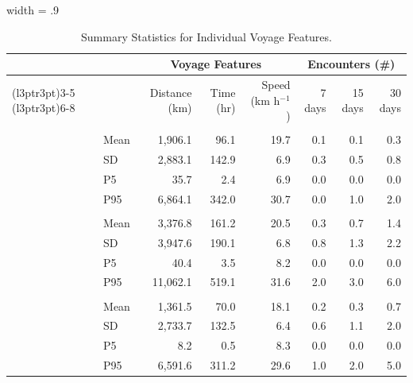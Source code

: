 \begin{table}
\centering
\caption{\label{tab:summary}Summary Statistics for Individual Voyage Features.}
\centering
\begin{adjustbox}{width = .9\textwidth}
\begin{threeparttable}
\begin{tabular}[t]{llrrrrrr}
\toprule
\multicolumn{2}{c}{ } & \multicolumn{3}{c}{Voyage Features} & \multicolumn{3}{c}{Encounters (\#)} \\
\cmidrule(l{3pt}r{3pt}){3-5} \cmidrule(l{3pt}r{3pt}){6-8}
 &  & Distance (km) & Time (hr) & Speed (km h$^{-1}$) & 7 days & 15 days & 30 days\\
\midrule
\addlinespace[0.3em]
\multicolumn{8}{l}{Gulf of Aden}\\
\hspace{1em} & Mean & 1,906.1 & 96.1 & 19.7 & 0.1 & 0.1 & 0.3\\
\hspace{1em} & SD & 2,883.1 & 142.9 & 6.9 & 0.3 & 0.5 & 0.8\\
\hspace{1em} & P5 & 35.7 & 2.4 & 6.9 & 0.0 & 0.0 & 0.0\\
\hspace{1em} & P95 & 6,864.1 & 342.0 & 30.7 & 0.0 & 1.0 & 2.0\\
\addlinespace[0.3em]
\multicolumn{8}{l}{Gulf of Guinea}\\
\hspace{1em} & Mean & 3,376.8 & 161.2 & 20.5 & 0.3 & 0.7 & 1.4\\
\hspace{1em} & SD & 3,947.6 & 190.1 & 6.8 & 0.8 & 1.3 & 2.2\\
\hspace{1em} & P5 & 40.4 & 3.5 & 8.2 & 0.0 & 0.0 & 0.0\\
\hspace{1em} & P95 & 11,062.1 & 519.1 & 31.6 & 2.0 & 3.0 & 6.0\\
\addlinespace[0.3em]
\multicolumn{8}{l}{Southeast Asia}\\
\hspace{1em} & Mean & 1,361.5 & 70.0 & 18.1 & 0.2 & 0.3 & 0.7\\
\hspace{1em} & SD & 2,733.7 & 132.5 & 6.4 & 0.6 & 1.1 & 2.0\\
\hspace{1em} & P5 & 8.2 & 0.5 & 8.3 & 0.0 & 0.0 & 0.0\\
\hspace{1em} & P95 & 6,591.6 & 311.2 & 29.6 & 1.0 & 2.0 & 5.0\\

\end{tabular}
\end{threeparttable}
\end{adjustbox}
\end{table}
